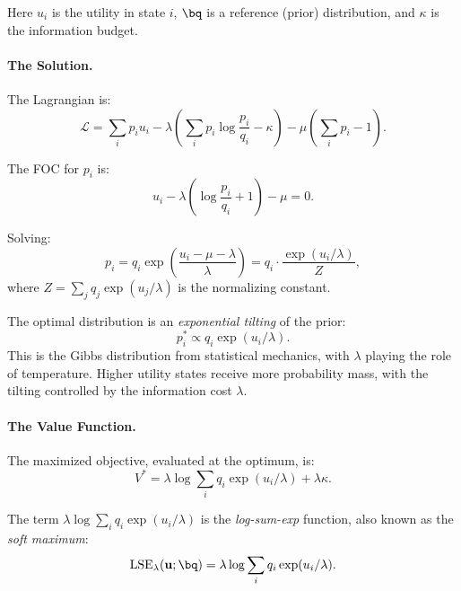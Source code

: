 Here $u_i$ is the utility in state $i$, $\bq$ is a reference (prior) distribution, and $\kappa$ is the information budget.

\paragraph{The Solution.}
The Lagrangian is:
\begin{equation}
\mathcal{L} = \sum_i p_i u_i - \lambda \left( \sum_i p_i \log \frac{p_i}{q_i} - \kappa \right) - \mu \left( \sum_i p_i - 1 \right).
\label{eq:ac-adv-kl-lagrangian}
\end{equation}

The FOC for $p_i$ is:
\begin{equation}
u_i - \lambda \left( \log \frac{p_i}{q_i} + 1 \right) - \mu = 0.
\label{eq:ac-adv-kl-foc}
\end{equation}

Solving:
\begin{equation}
p_i = q_i \exp\left( \frac{u_i - \mu - \lambda}{\lambda} \right) = q_i \cdot \frac{\exp(u_i / \lambda)}{Z},
\label{eq:ac-adv-kl-solution}
\end{equation}
where $Z = \sum_j q_j \exp(u_j / \lambda)$ is the normalizing constant.

\begin{calloutimportant}
The optimal distribution is an \emph{exponential tilting} of the prior:
\[
p_i^* \propto q_i \exp(u_i / \lambda).
\]
This is the Gibbs distribution from statistical mechanics, with $\lambda$ playing the role of temperature. Higher utility states receive more probability mass, with the tilting controlled by the information cost $\lambda$.
\end{calloutimportant}

\paragraph{The Value Function.}
The maximized objective, evaluated at the optimum, is:
\begin{equation}
V^* = \lambda \log \sum_i q_i \exp(u_i / \lambda) + \lambda \kappa.
\label{eq:ac-adv-kl-value}
\end{equation}

The term $\lambda \log \sum_i q_i \exp(u_i / \lambda)$ is the \emph{log-sum-exp} function, also known as the \emph{soft maximum}:
\begin{equation}
\text{LSE}_\lambda(\bu; \bq) = \lambda \log \sum_i q_i \exp(u_i / \lambda).
\label{eq:ac-adv-lse}
\end{equation}

